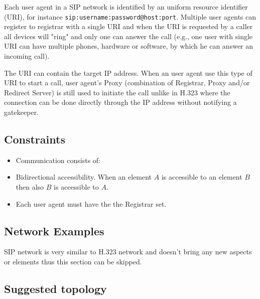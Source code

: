 Each user agent in a SIP network is identified by an uniform resource 
identifier (URI), for instance \verb|sip:username:password@host:port|. 
Multiple user agents can register to registrar with a single URI and when the 
URI is requested by a caller all devices will "ring" and only one can answer 
the call (e.g., one user with single URI can have multiple phones, hardware or 
software, by which he can answer an incoming call).

The URI can contain the target IP address. When an user agent use this type of 
URI to start a call, user agent's Proxy (combination of Registrar, Proxy 
and/or Redirect Server) is still used to initiate the call unlike in H.323 
where the connection can be done directly through the IP address without 
notifying a gatekeeper.

\subsection{Constraints}

\begin{itemize}

\item Communication consists of:

\item Bidirectional accessibility. When an element $A$ is accessible to an 
element $B$ then also $B$ is accessible to $A$.

\item Each user agent must have the the Registrar set.

\end{itemize}

\subsection{Network Examples}

SIP network is very similar to H.323 network and doesn't bring any new aspects 
or elements thus this section can be skipped.

\subsection{Suggested topology}

